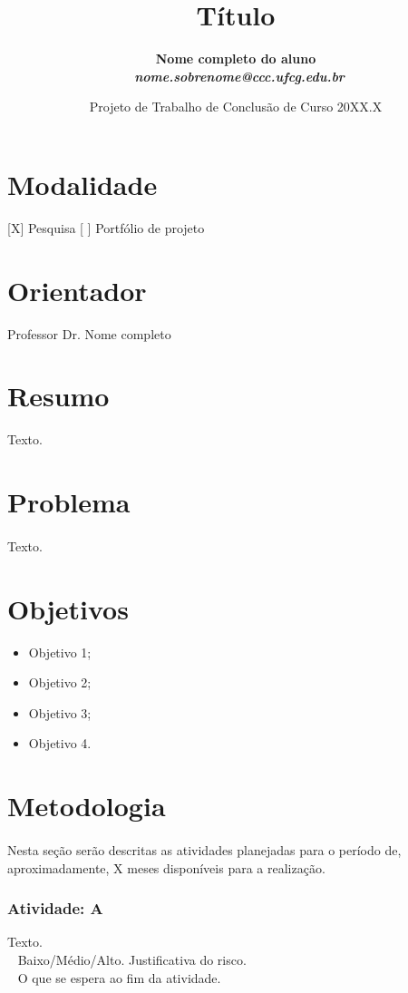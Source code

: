 \documentclass{article}
\title{Título \vspace{0.5cm}}
\author{\bf{Nome completo do aluno} \\\
{\em{nome.sobrenome@ccc.ufcg.edu.br}}}
\date{\vspace{0.5cm} Projeto de Trabalho de Conclusão de Curso 20XX.X}
\begin{document}
\maketitle

\section{Modalidade}
[X] Pesquisa        [ ] Portfólio de projeto 

\section{Orientador}
Professor Dr. Nome completo 

\section{Resumo}
Texto. 

\section{Problema}
\paragraph{}
Texto.

\section{Objetivos}

\begin{itemize}
\item Objetivo 1;
\item Objetivo 2;
\item Objetivo 3;
\item Objetivo 4.

\end{itemize}

\section{Metodologia}
\paragraph{}
Nesta seção serão descritas as atividades planejadas para o período de, aproximadamente, X meses disponíveis para a realização.

\subsubsection*{Atividade: A} 
 Texto.
\\\
 Baixo/Médio/Alto. Justificativa do risco.
\\\
 O que se espera ao fim da atividade.
\end{document}
